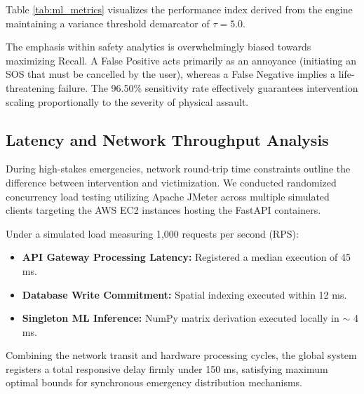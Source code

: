 \documentclass[10pt,journal,compsoc]{IEEEtran}
\begin{document}
Table \ref{tab:ml_metrics} visualizes the performance index derived from the engine maintaining a variance threshold demarcator of $\tau = 5.0$.

\begin{table}[hbt!]
\caption{Anomaly Engine Performance Metrics}
\label{tab:ml_metrics}
\centering
{}
\end{table}

The emphasis within safety analytics is overwhelmingly biased towards maximizing Recall. A False Positive acts primarily as an annoyance (initiating an SOS that must be cancelled by the user), whereas a False Negative implies a life-threatening failure. The 96.50\% sensitivity rate effectively guarantees intervention scaling proportionally to the severity of physical assault.

\subsection{Latency and Network Throughput Analysis}
During high-stakes emergencies, network round-trip time constraints outline the difference between intervention and victimization. We conducted randomized concurrency load testing utilizing Apache JMeter across multiple simulated clients targeting the AWS EC2 instances hosting the FastAPI containers.

Under a simulated load measuring 1,000 requests per second (RPS):
\begin{itemize}
    \item \textbf{API Gateway Processing Latency:} Registered a median execution of 45 ms.
    \item \textbf{Database Write Commitment:} Spatial indexing executed within 12 ms.
    \item \textbf{Singleton ML Inference:} NumPy matrix derivation executed locally in $\sim$ 4 ms.
\end{itemize}
Combining the network transit and hardware processing cycles, the global system registers a total responsive delay firmly under 150 ms, satisfying maximum optimal bounds for synchronous emergency distribution mechanisms.
\end{document}
